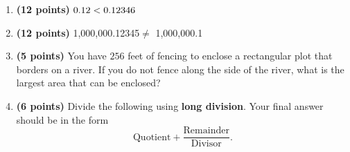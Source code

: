 \documentclass[12pt]{amsart}
\begin{document}
\begin{enumerate}
\item {\bf (12 points)} 
 $\atwofive < \btwofive$ 
\vfill 
\def \a{7}\def \atwoone{1}\def \atwotwo{3}\def \atwothree{2}\def \btwothree{6}\def \sumtwothree{8}\def \diftwothree{-4}\def \bigtwothree{200}\def \powtwothree{36}\def \logtwothree{0.3868528072345416}\def \factortwothree{65}\def \atwofour{1.84}\def \btwofour{1.28}\def \tooshorttwofour{10.1}\def \moneytwofour{10.10}\def \longertwofour{10.10000}\def \atwofive{0.12}\def \btwofive{0.12346}\def \athreeone{4}\def \bthreeone{3}\def \setthreetwo{[2, 5, 6]}\def \athreetwo{2}\def \bthreetwo{5}\def \cthreetwo{6}\def \controlthreethree{8}\def \athreethree{4}\def \topthreethree{1}\def \athreefour{3}\def \bthreefour{4}\def \listthreefour{[1, 2, 4, 5]}\def \afourone{12}\def \bfourone{4}\def \fracfourone{3}\def \rootfourtwo{20}\def \simplifiedfourtwo{2 \sqrt{5}}\def \sqrtlistfourtwo{[2, 5]}\def \outfourtwo{2}\def \infourtwo{5}\def \wowfourtwo{1}\def \afourthree{0}\def \nicethreefour{3x^{2}-x^{}}\def \nastythreefour{xyz^{3}}\def \cfourthree{-4}\def \dfourthree{10}\def \infourthree{-4x^{}}\def \outfourthree{+10y^{}}\def \afourfour{1107267}\def \nicefourfour{1,107,267}\def \goodfourfour{1,000,000.12345}\def \badfourfour{1,000,000.1}
\item {\bf (12 points)} 
  \goodfourfour $\neq$ \badfourfour 
\vfill 
\newpage\def \x{64}\def \y{128}\def \L{256}\def \area{8192}
\item {\bf (5 points)} 
 You have $\L$ feet of fencing to enclose a rectangular plot that borders on a river. If you do not fence along the side of the river, what is the largest area that can be enclosed? \\

  
\vfill \vfill \vfill
\def \a{6}\def \b{3}\def \c{-7}\def \r{12}\def \monicpol{x^{}+6}\def \longnbad{3x^{2}+11x^{}-30}\def \anspol{3x^{}-7}
\item {\bf (6 points)} 
 Divide the following using {\bf long division}. Your final answer should be in the form $$ \text{Quotient} + \dfrac{\text{Remainder}}{\text{Divisor}}.$$

\vspace{3mm}


\end{enumerate}
\end{document}
